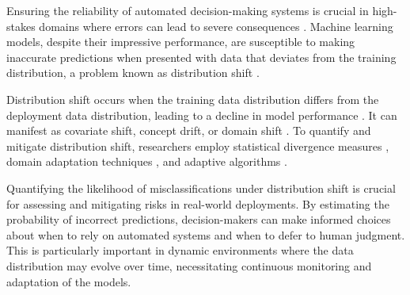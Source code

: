 Ensuring the reliability of automated decision-making systems is crucial in high-stakes domains where errors can lead to severe consequences \cite{amodei2016concrete}. Machine learning models, despite their impressive performance, are susceptible to making inaccurate predictions when presented with data that deviates from the training distribution, a problem known as distribution shift \cite{hendrycks2021many, quinonero2009dataset}.

Distribution shift occurs when the training data distribution differs from the deployment data distribution, leading to a decline in model performance \cite{quinonero2009dataset, hendrycks2019benchmarking}. It can manifest as covariate shift, concept drift, or domain shift \cite{moreno2012unifying, shimodaira2000improving, gama2014survey, patel2015visual}. To quantify and mitigate distribution shift, researchers employ statistical divergence measures \cite{kullback1951information, gretton2012kernel}, domain adaptation techniques \cite{wang2018deep, sugiyama2007covariate, pan2009survey, ganin2016domain}, and adaptive algorithms \cite{lu2018learning, baena2006early}.

Quantifying the likelihood of misclassifications under distribution shift is crucial for assessing and mitigating risks in real-world deployments. By estimating the probability of incorrect predictions, decision-makers can make informed choices about when to rely on automated systems and when to defer to human judgment. This is particularly important in dynamic environments where the data distribution may evolve over time, necessitating continuous monitoring and adaptation of the models.




